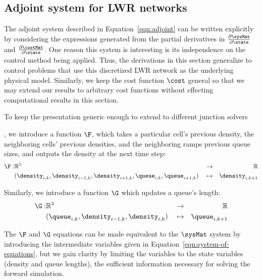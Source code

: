 
\subsection{Adjoint system for LWR networks} %
\label{sub:adjoint_system}

The adjoint system described in Equation~\eqref{eqn:adjoint} can be written explicitly by considering the expressions generated from the partial derivatives in $\dhdx$ and $\djdx$. One reason this system is interesting is its independence on the control method being applied. Thus, the derivations in this section generalize to control problems that use this discretized LWR network as the underlying physical model. Similarly, we keep the cost function $\cost$ general so that we may extend our results to arbitrary cost functions without effecting computational results in this section.

To keep the presentation generic enough to extend to different junction solvers 

, we introduce a function $\F$, which takes a particular cell's previous density, the neighboring cells' previous densities, and the neighboring ramps previous queue sizes, and outputs the density at the next time step:
\begin{equation}
\begin{aligned}
\label{eqn:forward-sim-function}
\F: &\Rbb^5 && \rightarrow & \Rbb \\
& (\idx{\density}{i}{k}, 
        \idx{\density}{i-1}{k}, 
        \idx{\density}{i+1}{k}, 
        \idx{\queue}{i}{k}, 
        \idx{\queue}{i+1}{k}) && \mapsto  & \idx{\density}{i}{k+1}
\end{aligned}
\end{equation}

Similarly, we introduce a function $\G$ which updates a queue's length:
\begin{equation}
\begin{aligned}
\label{eqn:forward-sim-function-queue}
\G: &\Rbb^3 && \rightarrow & \Rbb \\
& (\idx{\queue}{i}{k}, 
        \idx{\density}{i-1}{k}, 
        \idx{\density}{i}{k}) && \mapsto  & \idx{\queue}{i}{k+1}
\end{aligned}
\end{equation}
\begin{remark}
The $\F$ and $\G$ equations can be made equivalent to the $\sysMat$ system by introducing the intermediate variables given in Equation~\eqref{eqn:system-of-equations}, but we gain clarity by limiting the variables to the state variables (density and queue lengths), the sufficient information necessary for solving the forward simulation.
\end{remark}

